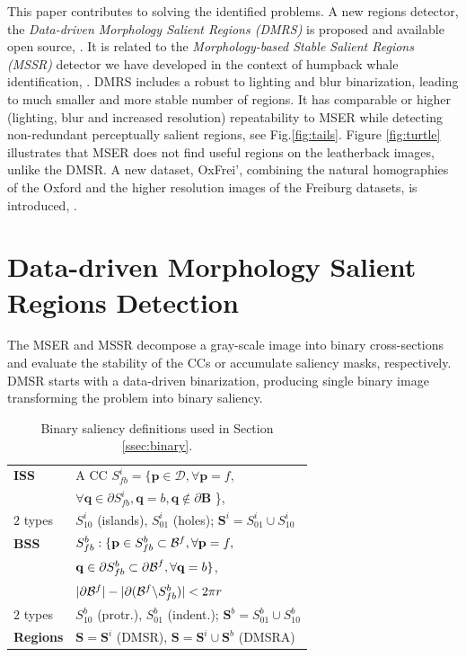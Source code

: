\documentclass{article}
\def\B{{\mathbf B}}
\def\mcD{{\mathcal{D}}}
\def\p{{\mathbf p}}
\def\q{{\mathbf q}}
\def\S{{\mathbf S}}
\begin{document}
This paper contributes to solving the identified problems. A new regions detector, the {\em Data-driven Morphology Salient Regions (DMRS)} is proposed and available open source, \cite{Rang:software}. It is related to the {\em Morphology-based Stable Salient Regions (MSSR)} detector we have developed in the context of humpback whale identification, \cite{RangMSSR06, RangHumpb06}. DMRS  includes a robust to lighting and blur binarization, leading to much smaller and more stable number of regions. It has comparable or higher (lighting, blur and increased resolution) repeatability to MSER while detecting non-redundant perceptually salient regions, see Fig.\ref{fig:tails}. Figure \ref{fig:turtle} illustrates that MSER does not find useful regions on the leatherback images, unlike the DMSR. A new dataset, OxFrei', combining the natural homographies of the Oxford and the higher resolution images of the Freiburg datasets, is introduced, \cite{Rang:dataset}.

\section{Data-driven Morphology Salient Regions Detection}
\label{sec:DMSR}

The MSER and MSSR decompose a gray-scale image into binary cross-sections and evaluate the stability of the CCs or accumulate saliency masks, respectively. DMSR starts with a data-driven binarization, producing single binary image transforming the problem into binary saliency.

\begin{table}[hbt]
\begin{minipage}[b]{0.98\linewidth}\begin{tabular}{|l l|}
\hline

{\bf ISS} & A CC $S^i_{fb} = \{\p \in \mcD, \forall \p=f,$\\&$\forall \q \in \partial S^i_{fb}, \q=b, \q \notin \partial \B $ \},\\
$2$ types & $S^i_{10}$ (islands), $S^i_{01}$  (holes); $\S^i = S_{01}^i \cup S_{10}^i$\\
{\bf BSS} &  $S_{fb}^b: \{\p \in S_{fb}^b \subset{\cal B}^f, \forall \p = f,$\\&$ \q \in \partial S_{fb}^b \subset {\partial \cal B}^f,\forall \q = b \}$, \\
& $|\partial {\cal B}^f| - |\partial ({\cal B}^f \backslash S_{fb}^b)| < 2 \pi r$\\
$2$ types & $S^b_{10}$ (protr.), $S^b_{01}$ (indent.); $\S^b = S_{01}^b \cup S_{10}^b$\\
{\bf Regions} &  $\S = \S^i$ (DMSR), $\S = \S^i \cup \S^b$ (DMSRA)  \\

\hline
\end{tabular}
\caption{Binary saliency definitions used in Section \ref{ssec:binary}.}\label{table:binary_sal}
\end{minipage}
\vspace*{-0.1cm}
\end{table}
\end{document}

